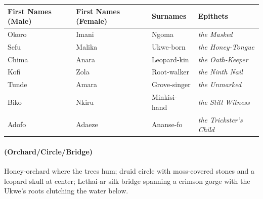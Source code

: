 \begin{longtable}{|p{}|p{}|p{}|p{}|}
\hline
\textbf{First Names (Male)} & \textbf{First Names (Female)} & \textbf{Surnames} & \textbf{Epithets} \\
\hline
Okoro & Imani & Ngoma & \textit{the Masked} \\
\hline
Sefu & Malika & Ukwe-born & \textit{the Honey-Tongue} \\
\hline
Chima & Anara & Leopard-kin & \textit{the Oath-Keeper} \\
\hline
Kofi & Zola & Root-walker & \textit{the Ninth Nail} \\
\hline
Tunde & Amara & Grove-singer & \textit{the Unmarked} \\
\hline
Biko & Nkiru & Minkisi-hand & \textit{the Still Witness} \\
\hline
Adofo & Adaeze & Ananse-fo & \textit{the Trickster's Child} \\
\hline
\end{longtable}

\paragraph*{(Orchard/Circle/Bridge)} Honey-orchard where the trees hum; druid circle with moss-covered stones and a leopard skull at center; Lethai-ar silk bridge spanning a crimson gorge with the Ukwe's roots clutching the water below.

